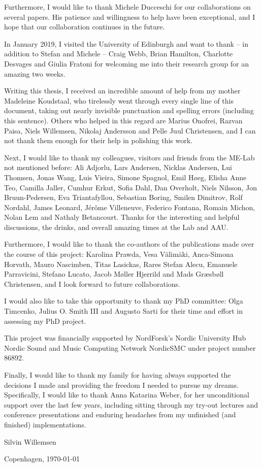 Furthermore, I would like to thank Michele Ducceschi for our collaborations on several papers. His patience and willingness to help have been exceptional, and I hope that our collaboration continues in the future.

In January 2019, I visited the University of Edinburgh and want to thank -- in addition to Stefan and Michele -- Craig Webb, Brian Hamilton, Charlotte Desvages and Giulia Fratoni for welcoming me into their research group for an amazing two weeks. 

Writing this thesis, I received an incredible amount of help from my mother Madeleine Koudstaal, who tirelessly went through every single line of this document, taking out nearly invisible punctuation and spelling errors (including this sentence). Others who helped in this regard are Marius Onofrei, Razvan Paisa, Niels Willemsen, Nikolaj Andersson and Pelle Juul Christensen, and I can not thank them enough for their help in polishing this work.

Next, I would like to thank my colleagues, visitors and friends from the ME-Lab not mentioned before: Ali Adjorlu, Lars Andersen, Nicklas Andersen, Lui Thomsen, Jonas Wang, Luis Vieira, Simone Spagnol, Emil H{\o}eg, Elisha Anne Teo, Camilla Jaller, Cumhur Erkut, Sofia Dahl, Dan Overholt, Niels Nilsson, Jon Bruun-Pedersen, Eva Triantafyllou, Sebastian Boring, Smilen Dimitrov, Rolf Nordahl, James Leonard, J{\'e}r{\^o}me Villeneuve, Federico Fontana, Romain Michon, Nolan Lem and Nathaly Betancourt. Thanks for the interesting and helpful discussions, the drinks, and overall amazing times at the Lab and AAU.

Furthermore, I would like to thank the co-authors of the publications made over the course of this project: Karolina Prawda, Vesa V{\"a}lim{\"a}ki, Anca-Simona Horvath, Mauro Nascimben, Titas Lasickas, Rares Stefan Alecu, Emanuele Parravicini, Stefano Lucato, Jacob M{\o}ller Hjerrild and Mads Græsbøll Christensen, and I look forward to future collaborations. 

I would also like to take this opportunity to thank my PhD committee: Olga Timcenko, Julius O. Smith III and Augusto Sarti for their time and effort in assessing my PhD project.

This project was financially supported by NordForsk's Nordic University Hub Nordic Sound and Music Computing Network NordicSMC under project number 86892.

Finally, I would like to thank my family for having always supported the decisions I made and providing the freedom I needed to pursue my dreams. Specifically, I would like to thank Anna Katarina Weber, for her unconditional support over the last few years, including sitting through my try-out lectures and conference presentations and enduring headaches from my unfinished (and finished) implementations.

\vfill
\hfill Silvin Willemsen

\hfill Copenhagen, \today
